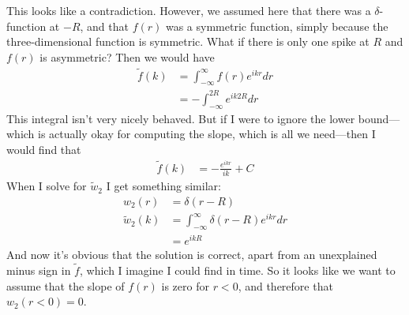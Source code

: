 \documentclass[letterpaper,twocolumn,amsmath,amssymb,prb]{revtex4-1}
\begin{document}
This looks like a contradiction.  However, we assumed here that there
was a $\delta$-function at $-R$, and that $f(r)$ was a symmetric
function, simply because the three-dimensional function is symmetric.
What if there is only one spike at $R$ and $f(r)$ is asymmetric?  Then
we would have
\begin{align}
  \tilde{f}(k) &= \int_{-\infty}^\infty f(r) e^{ikr} dr \\
  &= -\int_{-\infty}^{2R} e^{ik2R} dr
\end{align}
This integral isn't very nicely behaved.  But if I were to ignore the
lower bound---which is actually okay for computing the slope, which is
all we need---then I would find that
\begin{align}
  \tilde{f}(k) &= -\frac{e^{ikr}}{ik} + C
\end{align}
When I solve for $\tilde{w}_2$ I get something similar:
\begin{align}
  w_2(r) &= \delta(r - R) \\
  \tilde{w}_2(k) &= \int_{-\infty}^\infty \delta(r-R) e^{ikr} dr \\
  &= e^{ikR}
\end{align}
And now it's obvious that the solution is correct, apart from an
unexplained minus sign in $\tilde{f}$, which I imagine I could find in
time.  So it looks like we want to assume that the slope of $f(r)$ is
zero for $r<0$, and therefore that $w_2(r<0)=0$.

\end{document}
